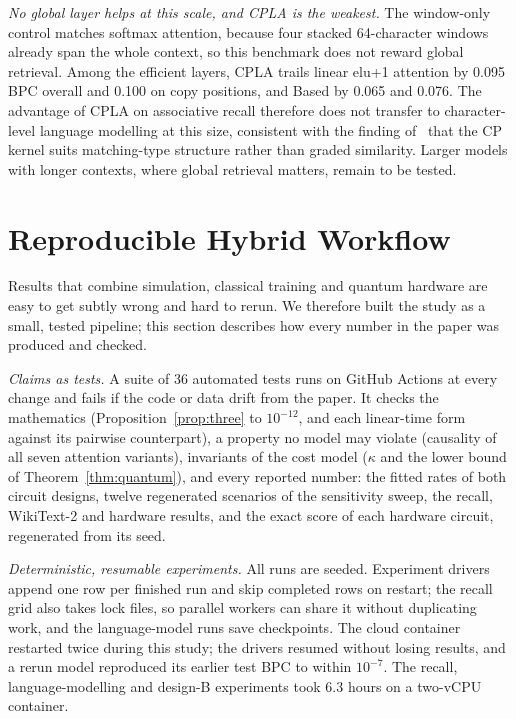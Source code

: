 \documentclass[conference]{IEEEtran}
\theoremstyle{definition}
\newcommand{\cpla}{CPLA}
\begin{document}
\textit{No global layer helps at this scale, and \cpla{} is the weakest.} The window-only control matches softmax attention, because four stacked 64-character windows already span the whole context, so this benchmark does not reward global retrieval. Among the efficient layers, \cpla{} trails linear elu+1 attention by 0.095 BPC overall and 0.100 on copy positions, and Based by 0.065 and 0.076. The advantage of \cpla{} on associative recall therefore does not transfer to character-level language modelling at this size, consistent with the finding of~\cite{singuru2026fidelity} that the CP kernel suits matching-type structure rather than graded similarity. Larger models with longer contexts, where global retrieval matters, remain to be tested.

\section{Reproducible Hybrid Workflow}
\label{sec:workflow}

Results that combine simulation, classical training and quantum hardware are easy to get subtly wrong and hard to rerun. We therefore built the study as a small, tested pipeline; this section describes how every number in the paper was produced and checked.

\textit{Claims as tests.} A suite of 36 automated tests runs on GitHub Actions at every change and fails if the code or data drift from the paper. It checks the mathematics (Proposition~\ref{prop:three} to $10^{-12}$, and each linear-time form against its pairwise counterpart), a property no model may violate (causality of all seven attention variants), invariants of the cost model ($\kappa$ and the lower bound of Theorem~\ref{thm:quantum}), and every reported number: the fitted rates of both circuit designs, twelve regenerated scenarios of the sensitivity sweep, the recall, WikiText-2 and hardware results, and the exact score of each hardware circuit, regenerated from its seed.

\textit{Deterministic, resumable experiments.} All runs are seeded. Experiment drivers append one row per finished run and skip completed rows on restart; the recall grid also takes lock files, so parallel workers can share it without duplicating work, and the language-model runs save checkpoints. The cloud container restarted twice during this study; the drivers resumed without losing results, and a rerun model reproduced its earlier test BPC to within $10^{-7}$. The recall, language-modelling and design-B experiments took 6.3 hours on a two-vCPU container.
\end{document}
